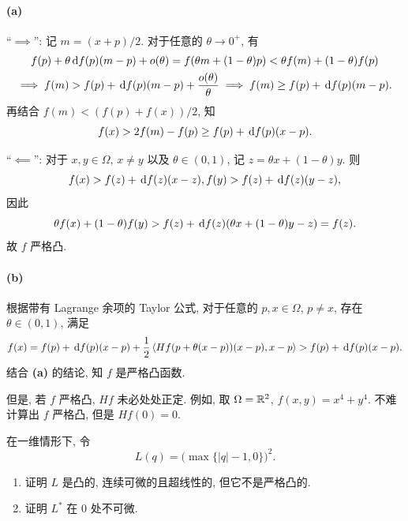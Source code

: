 \documentclass{article}
\begin{document}
\begin{solution}
	\paragraph{(a)} ``$\implies$'': 记 $m = (x+p)/2$. 对于任意的 $\theta \to 0^+$, 有
	\begin{gather*}
		f(p) + \theta\,\mathrm{d} f(p) (m-p) + o(\theta) = f(\theta m + (1-\theta) p) < \theta f(m) + (1-\theta) f(p) \\
		\implies f(m) > f(p) + \,\mathrm{d} f(p)(m-p) + \frac{o(\theta)}{\theta} 
		\implies f(m) \ge f(p) + \,\mathrm{d} f(p)(m-p).
	\end{gather*}
	再结合 $f(m) < (f(p)+f(x))/2$, 知
	\[ f(x) > 2f(m) - f(p) \ge f(p) + \,\mathrm{d} f(p)(x-p). \]

	``$\impliedby$'': 对于 $x,y \in \Omega$, $x \neq y$ 以及 $\theta \in (0,1)$, 记 $z = \theta x + (1-\theta) y$. 则
	\[ f(x)>f(z) + \,\mathrm{d} f(z) (x-z), f(y)>f(z) + \,\mathrm{d} f(z)(y-z), \]
	因此
	\[ \theta f(x) + (1-\theta) f(y) > f(z) + \,\mathrm{d} f(z)(\theta x + (1-\theta) y -z) = f(z). \]
	故 $f$ 严格凸.

	\paragraph{(b)} 根据带有 Lagrange 余项的 Taylor 公式, 对于任意的 $p, x \in \Omega$, $p \neq x$, 存在 $\theta \in (0,1)$, 满足
	\[ f(x) = f(p) + \,\mathrm{d} f(p)(x-p) + \frac{1}{2}\left\langle Hf(p+\theta(x-p))(x-p), x-p \right\rangle > f(p) + \,\mathrm{d} f(p)(x-p). \]
	结合 \textbf{(a)} 的结论, 知 $f$ 是严格凸函数. 

	但是, 若 $f$ 严格凸, $Hf$ 未必处处正定. 例如, 取 $\Omega = \mathbb{R}^2$, $f(x,y) = x^4 + y^4$. 不难计算出 $f$ 严格凸, 但是 $Hf(0) = 0$.
\end{solution}



\begin{problem}
  在一维情形下, 令
  \[
    L(q)=\bigl(\max\{|q|-1,0\}\bigr)^2.
  \]
  \begin{enumerate}
    \item[(a)] 证明 $L$ 是凸的, 连续可微的且超线性的, 但它不是严格凸的.
    \item[(b)] 证明 $L^*$ 在 $0$ 处不可微.
  \end{enumerate}
\end{problem}
\end{document}
